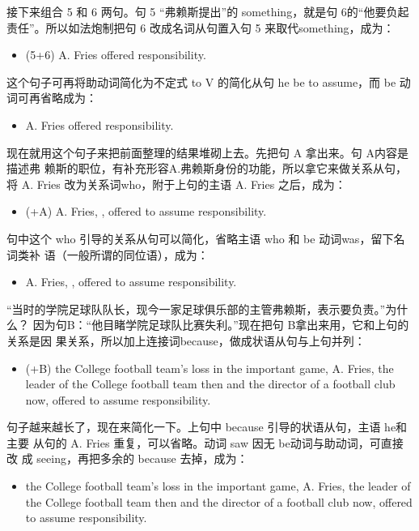 接下来组合 5 和 6 两句。句 5 “弗赖斯提出”的 something，就是句 6的“他要负起
责任”。所以如法炮制把句 6 改成名词从句置入句 5 来取代something，成为：
\begin{itemize}
\item (5+6) A. Fries offered  responsibility.
\end{itemize}
这个句子可再将助动词简化为不定式 to V 的简化从句 he be to assume，而 be
动词可再省略成为：
\begin{itemize}
\item A. Fries offered  responsibility.
\end{itemize}

现在就用这个句子来把前面整理的结果堆砌上去。先把句 A 拿出来。句 A内容是描述弗
赖斯的职位，有补充形容A.弗赖斯身份的功能，所以拿它来做关系从句，将 A. Fries
改为关系词who，附于上句的主语 A. Fries 之后，成为：
\begin{itemize}
\item (+A) A. Fries, , offered to assume responsibility.
\end{itemize}
句中这个 who 引导的关系从句可以简化，省略主语 who 和 be 动词was，留下名词类补
语（一般所谓的同位语），成为：
\begin{itemize}
\item A. Fries, , offered to assume responsibility.
\end{itemize}
“当时的学院足球队队长，现今一家足球俱乐部的主管弗赖斯，表示要负责。”为什么？
因为句B：“他目睹学院足球队比赛失利。”现在把句 B拿出来用，它和上句的关系是因
果关系，所以加上连接词because，做成状语从句与上句并列：
\begin{itemize}
\item (+B)  the College football team's loss in the important
  game, A. Fries, the leader of the College football team then and the
  director of a football club now, offered to assume responsibility.
\end{itemize}
句子越来越长了，现在来简化一下。上句中 because 引导的状语从句，主语 he和主要
从句的 A. Fries 重复，可以省略。动词 saw 因无 be动词与助动词，可直接改
成 seeing，再把多余的 because 去掉，成为：
\begin{itemize}
\item {} the College football team's loss in the important game, A. Fries,
  the leader of the College football team then and the director of a
  football club now, offered to assume responsibility.
\end{itemize}

